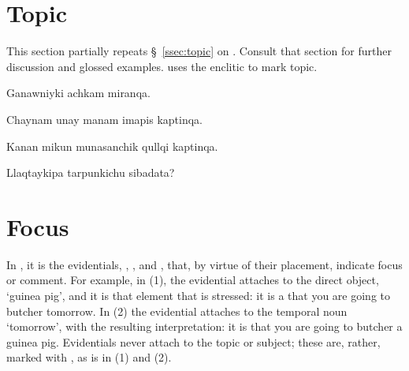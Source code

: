 \section{Topic}
This section partially repeats \S~\ref{ssec:topic} on . Consult that section for further discussion and glossed examples. \SYQ{} uses the enclitic  to mark topic.

%
{Ganawniyki achkam miranqa.}%
{}%
{}{}%

%
{Chaynam unay manam imapis kaptinqa.}%
{}%
{}{}%

%
{Kanan mikun munasanchik qullqi kaptinqa.}%
{}%
{}{}%

%
{Llaqtaykipa \textquestiondown{}tarpunkichu sibadata?}%
{}%
{}{}%

\section{Focus}\label{sec:emphasis}
In \SYQ{}, it is the evidentials, , , and , that, by virtue of their placement, indicate focus or comment. For example, in (1), the evidential attaches to the direct object,  `guinea pig', and it is that element that is stressed: it is a  that you are going to butcher tomorrow. In (2) the evidential attaches to the temporal noun  `tomorrow', with the resulting interpretation: it is  that you are going to butcher a guinea pig. Evidentials never attach to the topic or subject; these are, rather, marked with , as is  in (1) and (2).

